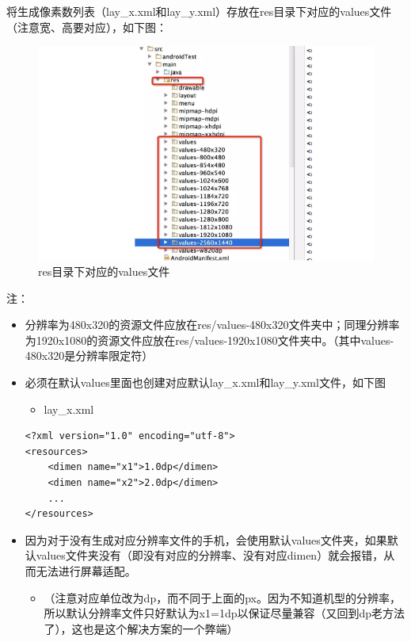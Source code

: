 \documentclass[9pt, b5paper]{article}
\begin{document}
\begin{enumerate}
\begin{enumerate}
\begin{enumerate}
将生成像素数列表（lay\_x.xml和lay\_y.xml）存放在res目录下对应的values文件（注意宽、高要对应），如下图：

\begin{figure}[htb]
\centering
\includegraphics[width=.9\linewidth]{./pic/res.png}
\caption{res目录下对应的values文件}
\end{figure}

注：
\begin{itemize}
\item 分辨率为480x320的资源文件应放在res/values-480x320文件夹中；同理分辨率为1920x1080的资源文件应放在res/values-1920x1080文件夹中。（其中values-480x320是分辨率限定符）
\item 必须在默认values里面也创建对应默认lay\_x.xml和lay\_y.xml文件，如下图
\begin{itemize}
\item lay\_x.xml
\end{itemize}
\begin{verbatim}
<?xml version="1.0" encoding="utf-8">
<resources>
    <dimen name="x1">1.0dp</dimen>
    <dimen name="x2">2.0dp</dimen>
    ...
</resources>
\end{verbatim}
\item 因为对于没有生成对应分辨率文件的手机，会使用默认values文件夹，如果默认values文件夹没有（即没有对应的分辨率、没有对应dimen）就会报错，从而无法进行屏幕适配。
\begin{itemize}
\item （注意对应单位改为dp，而不同于上面的px。因为不知道机型的分辨率，所以默认分辨率文件只好默认为x1=1dp以保证尽量兼容（又回到dp老方法了），这也是这个解决方案的一个弊端）
\end{itemize}
\end{itemize}


\end{enumerate}
\end{enumerate}
\end{enumerate}
\end{document}
